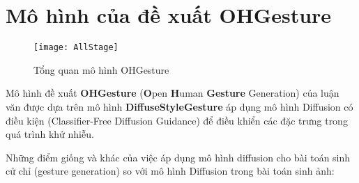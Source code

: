 


\pagebreak

\section{Mô hình của đề xuất OHGesture}
\label{sec:ohgesture}



\begin{figure}[H]
	\centering
		\texttt{[image: AllStage]}
	\caption{Tổng quan mô hình OHGesture}
	\label{fig:TrainingAndSampling}
\end{figure}

Mô hình đề xuất \textbf{OHGesture} (\textbf{O}pen \textbf{H}uman \textbf{Gesture} Generation) của luận văn được dựa trên mô hình \textbf{DiffuseStyleGesture} \cite{yang2023diffusestylegesture} áp dụng mô hình Diffusion \cite{ho2020denoising} có điều kiện \cite{ho2022classifier} (Classifier-Free Diffusion Guidance) để điều khiển các đặc trưng trong quá trình khử nhiễu. 

Những điểm giống và khác của việc áp dụng mô hình diffusion cho bài toán sinh cử chỉ (gesture generation) so với mô hình Diffusion trong bài toán sinh ảnh:


